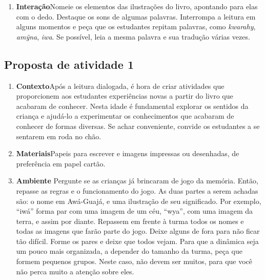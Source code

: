\documentclass[11pt]{extarticle}
\begin{document}
{{\begin{enumerate}
Não deixe que eles fiquem sem entender do que se trata. Crie 
um ambiente amigável onde a criança se sinta à vontade para fazer 
perguntas e comentários durante a leitura.


\item \textbf{Interação}\quad Nomeie os elementos das ilustrações 
do livro, apontando para elas com o dedo. Destaque os sons de algumas 
palavras. Interrompa a leitura em alguns momentos e peça que 
os estudantes repitam palavras, como \textit{kwarahy}, \textit{amỹna}, \textit{iwa}. Se possível, 
leia a mesma palavra e sua tradução várias vezes.
\end{enumerate}


\subsection{Proposta de atividade 1}

 

\begin{enumerate}
\item \textbf{Contexto}\quad Após a leitura dialogada, é hora de criar 
atividades que proporcionem aos estudantes experiências novas a partir do livro
que acabaram de conhecer. Nesta idade é fundamental explorar os sentidos da criança e 
ajudá-lo a experimentar os conhecimentos que acabaram de conhecer de formas diversas. Se achar 
conveniente, convide os estudantes a se sentarem em roda no chão.

\item \textbf{Materiais}\quad Papeis para escrever e imagens impressas ou desenhadas, de preferência
em papel cartão.

\item \textbf{Ambiente}\quad 
Pergunte se as crianças já brincaram de jogo da memória. Então, repasse as regras e o funcionamento
do jogo. As duas partes a serem achadas são: o nome em Awá-Guajá, e uma ilustração de 
seu significado. Por exemplo, ``iwá'' forma par com uma imagem de um céu, ``wya'', com uma imagem da terra,
e assim por diante. Repassem em frente à turma todos os nomes e todas as imagens que farão parte do jogo.
Deixe alguns de fora para não ficar tão difícil. Forme os pares e deixe que todos vejam. 
Para que a dinâmica seja um pouco mais organizada, a depender do tamanho da turma, peça
que formem pequenos grupos. Neste caso, não devem ser muitos, para que você não perca muito
a atenção sobre eles. 


\end{enumerate}}}
\end{document}
